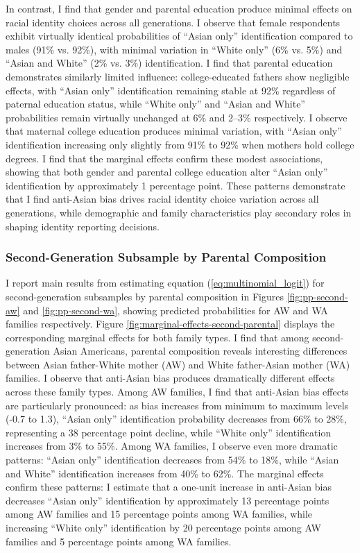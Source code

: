 In contrast, I find that gender and parental education produce minimal effects on racial identity choices across all generations. I observe that female respondents exhibit virtually identical probabilities of ``Asian only'' identification compared to males (91\% vs. 92\%), with minimal variation in ``White only'' (6\% vs. 5\%) and ``Asian and White'' (2\% vs. 3\%) identification. I find that parental education demonstrates similarly limited influence: college-educated fathers show negligible effects, with ``Asian only'' identification remaining stable at 92\% regardless of paternal education status, while ``White only'' and ``Asian and White'' probabilities remain virtually unchanged at 6\% and 2--3\% respectively. I observe that maternal college education produces minimal variation, with ``Asian only'' identification increasing only slightly from 91\% to 92\% when mothers hold college degrees. I find that the marginal effects confirm these modest associations, showing that both gender and parental college education alter ``Asian only'' identification by approximately 1 percentage point. These patterns demonstrate that I find anti-Asian bias drives racial identity choice variation across all generations, while demographic and family characteristics play secondary roles in shaping identity reporting decisions.

\subsubsection*{Second-Generation Subsample by Parental Composition}

I report main results from estimating equation (\ref{eq:multinomial_logit}) for second-generation subsamples by parental composition in Figures \ref{fig:pp-second-aw} and \ref{fig:pp-second-wa}, showing predicted probabilities for AW and WA families respectively. Figure \ref{fig:marginal-effects-second-parental} displays the corresponding marginal effects for both family types. I find that among second-generation Asian Americans, parental composition reveals interesting differences between Asian father-White mother (AW) and White father-Asian mother (WA) families. I observe that anti-Asian bias produces dramatically different effects across these family types. Among AW families, I find that anti-Asian bias effects are particularly pronounced: as bias increases from minimum to maximum levels (-0.7 to 1.3), ``Asian only'' identification probability decreases from 66\% to 28\%, representing a 38 percentage point decline, while ``White only'' identification increases from 3\% to 55\%. Among WA families, I observe even more dramatic patterns: ``Asian only'' identification decreases from 54\% to 18\%, while ``Asian and White'' identification increases from 40\% to 62\%. The marginal effects confirm these patterns: I estimate that a one-unit increase in anti-Asian bias decreases ``Asian only'' identification by approximately 13 percentage points among AW families and 15 percentage points among WA families, while increasing ``White only'' identification by 20 percentage points among AW families and 5 percentage points among WA families.

